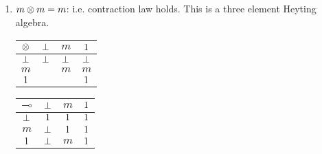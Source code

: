 \begin{example} 
\begin{enumerate}
\begin{enumerate}
\begin{tabular}{c|ccc}
  $\RLone$   &     &     & $\RLone$  \\
\end{tabular}
\hskip 48pt
\begin{tabular}{c|ccc}
  $\RLimp$   & $\LTCbot$ & $m$ & $\RLone$  \\ \hline
  $\LTCbot$  & $\RLone$ & $\RLone$ & $\RLone$ \\
  $m$        & $m$ & $\RLone$ & $\RLone$ \\
  $\RLone$  & $\LTCbot$ & $m$ & $\RLone$ \\
\end{tabular}
%
\item {\em $m \otimes m = m$}: i.e. contraction law holds.
This is a three element Heyting algebra.
\begin{tabular}{c|ccc}
  $\otimes$ & $\LTCbot$ &  $m$  & $\RLone$ \\ \hline
  $\LTCbot$  &  $\LTCbot$ & $\LTCbot$  & $\LTCbot$   \\
  $m$  &     & $m$  & $m$  \\
  $\RLone$   &     &     & $\RLone$  \\
\end{tabular}
\hskip 48pt 
\begin{tabular}{c|ccc}
  $\RLimp$   & $\LTCbot$ & $m$ & $\RLone$  \\ \hline
  $\LTCbot$  & $\RLone$ & $\RLone$ & $\RLone$ \\
  $m$        & $\LTCbot$ & $\RLone$ & $\RLone$ \\
  $\RLone$  & $\LTCbot$ & $m$ & $\RLone$ \\
\end{tabular}
\end{enumerate}
\end{enumerate}
\end{example}

